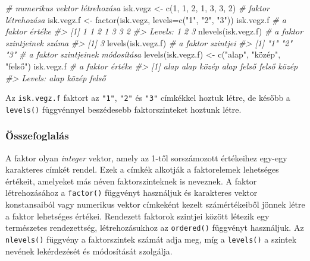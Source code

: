\documentclass[
]{book}
\makeatletter
\newenvironment{Shaded}{\begin{snugshade}}{\end{snugshade}}
\newcommand{\AttributeTok}[1]{\textcolor[rgb]{0.77,0.63,0.00}{#1}}
\newcommand{\CommentTok}[1]{\textcolor[rgb]{0.56,0.35,0.01}{\textit{#1}}}
\newcommand{\DecValTok}[1]{\textcolor[rgb]{0.00,0.00,0.81}{#1}}
\newcommand{\FunctionTok}[1]{\textcolor[rgb]{0.00,0.00,0.00}{#1}}
\newcommand{\NormalTok}[1]{#1}
\newcommand{\OtherTok}[1]{\textcolor[rgb]{0.56,0.35,0.01}{#1}}
\newcommand{\StringTok}[1]{\textcolor[rgb]{0.31,0.60,0.02}{#1}}
\newenvironment{kframe}{%
\medskip{}
\setlength{\fboxsep}{.8em}
 \def\at@end@of@kframe{}%
 \ifinner\ifhmode%
  \def\at@end@of@kframe{\end{minipage}}%
  \begin{minipage}{\columnwidth}%
 \fi\fi%
 \def\FrameCommand##1{\hskip\@totalleftmargin \hskip-\fboxsep
 \colorbox{shadecolor}{##1}\hskip-\fboxsep
     \hskip-\linewidth \hskip-\@totalleftmargin \hskip\columnwidth}%
 \MakeFramed {\advance\hsize-\width
   \@totalleftmargin\z@ \linewidth\hsize
   \@setminipage}}%
 {\par\unskip\endMakeFramed%
 \at@end@of@kframe}
\newenvironment{rmdblock}[1]
  {
  \begin{itemize}
  \renewcommand{\labelitemi}{
    \raisebox{-.7\height}[0pt][0pt]{
      {\setkeys{Gin}{width=3em,keepaspectratio}\texttt{[image: images/\#1]}}
    }
  }
  \setlength{\fboxsep}{1em}
  \begin{kframe}
  \item
  }
  {
  \end{kframe}
  \end{itemize}
  }
\newenvironment{rmdsummary}
  {\begin{rmdblock}{summary}}
  {\end{rmdblock}}
\makeatother
\begin{document}
\begin{Shaded}
\begin{Highlighting}[]
\CommentTok{\# numerikus vektor létrehozása}
\NormalTok{isk.vegz   }\OtherTok{\textless{}{-}} \FunctionTok{c}\NormalTok{(}\DecValTok{1}\NormalTok{, }\DecValTok{1}\NormalTok{, }\DecValTok{2}\NormalTok{, }\DecValTok{1}\NormalTok{, }\DecValTok{3}\NormalTok{, }\DecValTok{3}\NormalTok{, }\DecValTok{2}\NormalTok{)}
\CommentTok{\# faktor létrehozása}
\NormalTok{isk.vegz.f }\OtherTok{\textless{}{-}} \FunctionTok{factor}\NormalTok{(isk.vegz, }\AttributeTok{levels=}\FunctionTok{c}\NormalTok{(}\StringTok{"1"}\NormalTok{, }\StringTok{"2"}\NormalTok{, }\StringTok{"3"}\NormalTok{)) }
\NormalTok{isk.vegz.f                              }\CommentTok{\# a faktor értéke}
\CommentTok{\#\textgreater{} [1] 1 1 2 1 3 3 2}
\CommentTok{\#\textgreater{} Levels: 1 2 3}
\FunctionTok{nlevels}\NormalTok{(isk.vegz.f)                     }\CommentTok{\# a faktor szintjeinek száma}
\CommentTok{\#\textgreater{} [1] 3}
\FunctionTok{levels}\NormalTok{(isk.vegz.f)                      }\CommentTok{\# a faktor szintjei}
\CommentTok{\#\textgreater{} [1] "1" "2" "3"}
\CommentTok{\# a faktor szintjeinek módosítása}
\FunctionTok{levels}\NormalTok{(isk.vegz.f) }\OtherTok{\textless{}{-}} \FunctionTok{c}\NormalTok{(}\StringTok{"alap"}\NormalTok{, }\StringTok{"közép"}\NormalTok{, }\StringTok{"felső"}\NormalTok{) }
\NormalTok{isk.vegz.f                              }\CommentTok{\# a faktor értéke}
\CommentTok{\#\textgreater{} [1] alap  alap  közép alap  felső felső közép}
\CommentTok{\#\textgreater{} Levels: alap közép felső}
\end{Highlighting}
\end{Shaded}

Az \texttt{isk.vegz.f} faktort az \texttt{"1"}, \texttt{"2"} és \texttt{"3"} címkékkel hoztuk létre, de később a \texttt{levels()} függvénnyel beszédesebb faktorszinteket hoztunk létre.

\hypertarget{az-r-nyelv-7-summary}{%
\subsubsection{Összefoglalás}\label{az-r-nyelv-7-summary}}

\begin{rmdsummary}
A faktor olyan \emph{integer} vektor, amely az 1-től sorszámozott
értékeihez egy-egy karakteres címkét rendel. Ezek a címkék alkotják a
faktorelemek lehetséges értékeit, amelyeket más néven faktorszinteknek
is neveznek. A faktor létrehozásához a \texttt{factor()} függvényt
használjuk és karakteres vektor konstansaiból vagy numerikus vektor
címkeként kezelt számértékeiből jönnek létre a faktor lehetséges
értékei. Rendezett faktorok szintjei között létezik egy természetes
rendezettség, létrehozásukhoz az \texttt{ordered()} függvényt
használjuk. Az \texttt{nlevels()} függvény a faktorszintek számát adja
meg, míg a \texttt{levels()} a szintek nevének lekérdezését és
módosítását szolgálja.
\end{rmdsummary}
\end{document}
